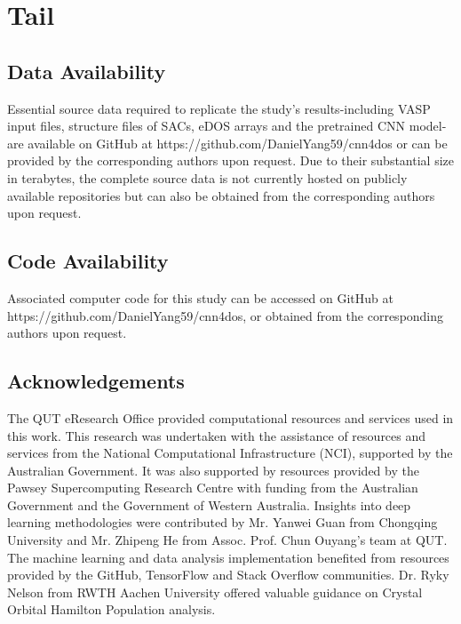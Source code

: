 

\section{Tail}

\subsection{Data Availability}
Essential source data required to replicate the study's results-including VASP input files,
structure files of SACs, eDOS arrays and the pretrained CNN model-are available on GitHub
at https://github.com/DanielYang59/cnn4dos or can be provided by the corresponding authors upon request.
Due to their substantial size in terabytes, the complete source data is not currently hosted on publicly available repositories but can also be obtained from the corresponding authors upon request.


\subsection{Code Availability}
Associated computer code for this study can be accessed on GitHub at https://github.com/DanielYang59/cnn4dos, or obtained from the corresponding authors upon request.


 \subsection{Acknowledgements}
The QUT eResearch Office provided computational resources and services used in this work.
This research was undertaken with the assistance of resources and services from the National Computational Infrastructure (NCI), supported by the Australian Government.
It was also supported by resources provided by the Pawsey Supercomputing Research Centre with funding from the Australian Government and the Government of Western Australia.
Insights into deep learning methodologies were contributed by Mr. Yanwei Guan from Chongqing University and Mr. Zhipeng He from Assoc. Prof. Chun Ouyang's team at QUT.
The machine learning and data analysis implementation benefited from resources provided by the GitHub, TensorFlow and Stack Overflow communities.
Dr. Ryky Nelson from RWTH Aachen University offered valuable guidance on Crystal Orbital Hamilton Population analysis.


